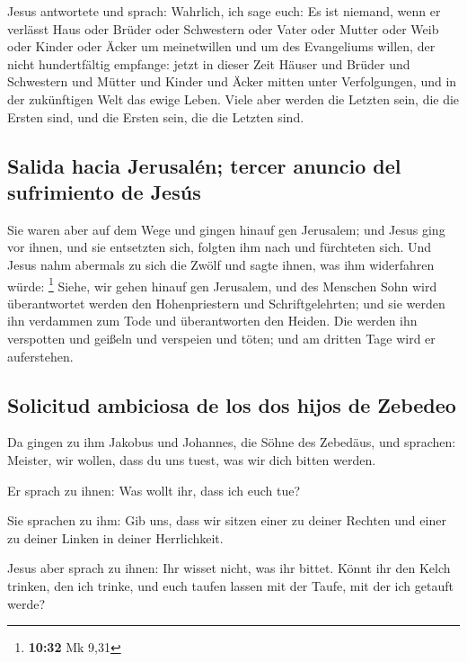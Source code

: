  Jesus antwortete und sprach: Wahrlich, ich sage euch: Es
ist niemand, wenn er verlässt Haus oder Brüder oder Schwestern oder
Vater oder Mutter oder Weib oder Kinder oder Äcker um meinetwillen und
um des Evangeliums willen,  der nicht hundertfältig
empfange: jetzt in dieser Zeit Häuser und Brüder und Schwestern und
Mütter und Kinder und Äcker mitten unter Verfolgungen, und in der
zukünftigen Welt das ewige Leben.  Viele aber werden die
Letzten sein, die die Ersten sind, und die Ersten sein, die die Letzten
sind.

\hypertarget{salida-hacia-jerusaluxe9n-tercer-anuncio-del-sufrimiento-de-jesuxfas}{%
\subsection{Salida hacia Jerusalén; tercer anuncio del sufrimiento de
Jesús}\label{salida-hacia-jerusaluxe9n-tercer-anuncio-del-sufrimiento-de-jesuxfas}}

 Sie waren aber auf dem Wege und gingen hinauf gen
Jerusalem; und Jesus ging vor ihnen, und sie entsetzten sich, folgten
ihm nach und fürchteten sich. Und Jesus nahm abermals zu sich die Zwölf
und sagte ihnen, was ihm widerfahren würde: \footnote{\textbf{10:32} Mk
  9,31}  Siehe, wir gehen hinauf gen Jerusalem, und des
Menschen Sohn wird überantwortet werden den Hohenpriestern und
Schriftgelehrten; und sie werden ihn verdammen zum Tode und
überantworten den Heiden.  Die werden ihn verspotten und
geißeln und verspeien und töten; und am dritten Tage wird er
auferstehen.

\hypertarget{solicitud-ambiciosa-de-los-dos-hijos-de-zebedeo}{%
\subsection{Solicitud ambiciosa de los dos hijos de
Zebedeo}\label{solicitud-ambiciosa-de-los-dos-hijos-de-zebedeo}}

 Da gingen zu ihm Jakobus und Johannes, die Söhne des
Zebedäus, und sprachen: Meister, wir wollen, dass du uns tuest, was wir
dich bitten werden.

 Er sprach zu ihnen: Was wollt ihr, dass ich euch tue?

 Sie sprachen zu ihm: Gib uns, dass wir sitzen einer zu
deiner Rechten und einer zu deiner Linken in deiner Herrlichkeit.

 Jesus aber sprach zu ihnen: Ihr wisset nicht, was ihr
bittet. Könnt ihr den Kelch trinken, den ich trinke, und euch taufen
lassen mit der Taufe, mit der ich getauft werde?

